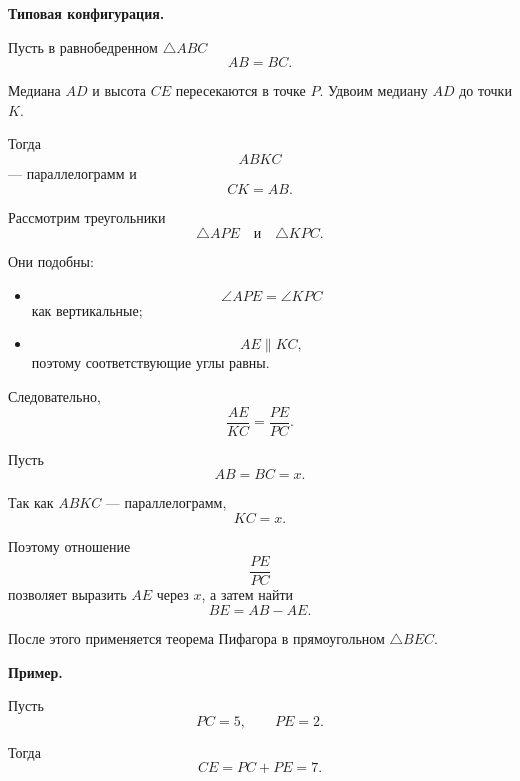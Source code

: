 \documentclass[a4paper,12pt]{article}
\begin{document}
\textbf{Типовая конфигурация.}

Пусть в равнобедренном $\triangle ABC$
\[
AB=BC.
\]

Медиана $AD$ и высота $CE$ пересекаются в точке $P$.
Удвоим медиану $AD$ до точки $K$.

Тогда
\[
ABKC
\]
--- параллелограмм и
\[
CK=AB.
\]

\begin{center}
\end{center}

Рассмотрим треугольники
\[
\triangle APE
\quad\text{и}\quad
\triangle KPC.
\]

Они подобны:

\begin{itemize}
  \item
  \[
  \angle APE=\angle KPC
  \]
  как вертикальные;

  \item
  \[
  AE\parallel KC,
  \]
  поэтому соответствующие углы равны.
\end{itemize}

Следовательно,
\[
\frac{AE}{KC}
=
\frac{PE}{PC}.
\]

Пусть
\[
AB=BC=x.
\]

Так как $ABKC$ --- параллелограмм,
\[
KC=x.
\]

Поэтому отношение
\[
\frac{PE}{PC}
\]
позволяет выразить $AE$ через $x$, а затем найти
\[
BE=AB-AE.
\]

После этого применяется теорема Пифагора в прямоугольном
$\triangle BEC$.

\textbf{Пример.}

Пусть
\[
PC=5,
\qquad
PE=2.
\]

Тогда
\[
CE=PC+PE=7.
\]
\end{document}
